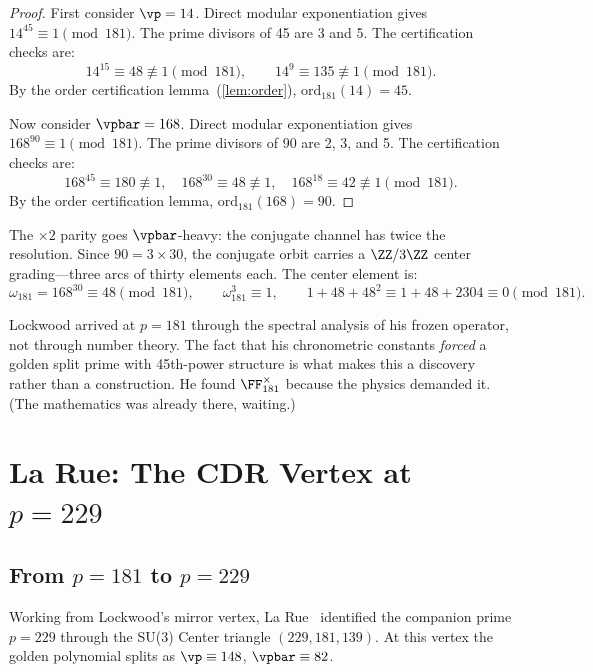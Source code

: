 \begin{proof}
First consider $\vp = 14$. Direct modular exponentiation gives $14^{45} \equiv 1 \pmod{181}$. The prime divisors of 45 are 3 and 5. The certification checks are:
\[
14^{15} \equiv 48 \not\equiv 1 \pmod{181}, \qquad 14^{9} \equiv 135 \not\equiv 1 \pmod{181}.
\]
By the order certification lemma~(\ref{lem:order}), $\mathrm{ord}_{181}(14) = 45$.

Now consider $\vpbar = 168$. Direct modular exponentiation gives $168^{90} \equiv 1 \pmod{181}$. The prime divisors of 90 are 2, 3, and 5. The certification checks are:
\[
168^{45} \equiv 180 \not\equiv 1, \quad 168^{30} \equiv 48 \not\equiv 1, \quad 168^{18} \equiv 42 \not\equiv 1 \pmod{181}.
\]
By the order certification lemma, $\mathrm{ord}_{181}(168) = 90$. \qedhere
\end{proof}

The $\times 2$ parity goes $\vpbar$-heavy: the conjugate channel has twice the resolution. Since $90 = 3 \times 30$, the conjugate orbit carries a $\ZZ/3\ZZ$ center grading---three arcs of thirty elements each. The center element is:
\[
\omega_{181} = 168^{30} \equiv 48 \pmod{181}, \qquad \omega_{181}^3 \equiv 1, \qquad 1 + 48 + 48^2 \equiv 1 + 48 + 2304 \equiv 0 \pmod{181}.
\]

\begin{remark}
Lockwood arrived at $p = 181$ through the spectral analysis of his frozen operator, not through number theory. The fact that his chronometric constants \emph{forced} a golden split prime with 45th-power structure is what makes this a discovery rather than a construction. He found $\FF_{181}^\times$ because the physics demanded it. (The mathematics was already there, waiting.)
\end{remark}


\section{La Rue: The CDR Vertex at $p = 229$}

\subsection{From $p = 181$ to $p = 229$}

Working from Lockwood's mirror vertex, La Rue~\cite{larue_chromatic,larue_lc} identified the companion prime $p = 229$ through the SU(3) Center triangle $(229, 181, 139)$. At this vertex the golden polynomial splits as $\vp \equiv 148$, $\vpbar \equiv 82$.

